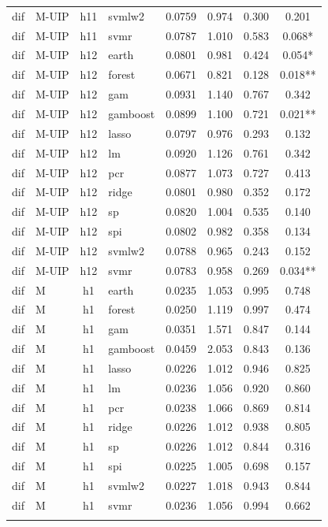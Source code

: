 \begin{ThreePartTable}
\begin{longtable}[t]{llclcccc}
dif & M-UIP & h11 & svmlw2 & 0.0759 & 0.974 & 0.300 & 0.201\\
dif & M-UIP & h11 & svmr & 0.0787 & 1.010 & 0.583 & 0.068*\\
\addlinespace
dif & M-UIP & h12 & earth & 0.0801 & 0.981 & 0.424 & 0.054*\\
dif & M-UIP & h12 & forest & 0.0671 & 0.821 & 0.128 & 0.018**\\
dif & M-UIP & h12 & gam & 0.0931 & 1.140 & 0.767 & 0.342\\
dif & M-UIP & h12 & gamboost & 0.0899 & 1.100 & 0.721 & 0.021**\\
dif & M-UIP & h12 & lasso & 0.0797 & 0.976 & 0.293 & 0.132\\
dif & M-UIP & h12 & lm & 0.0920 & 1.126 & 0.761 & 0.342\\
dif & M-UIP & h12 & pcr & 0.0877 & 1.073 & 0.727 & 0.413\\
dif & M-UIP & h12 & ridge & 0.0801 & 0.980 & 0.352 & 0.172\\
dif & M-UIP & h12 & sp & 0.0820 & 1.004 & 0.535 & 0.140\\
dif & M-UIP & h12 & spi & 0.0802 & 0.982 & 0.358 & 0.134\\
dif & M-UIP & h12 & svmlw2 & 0.0788 & 0.965 & 0.243 & 0.152\\
dif & M-UIP & h12 & svmr & 0.0783 & 0.958 & 0.269 & 0.034**\\
\addlinespace
dif & M & h1 & earth & 0.0235 & 1.053 & 0.995 & 0.748\\
dif & M & h1 & forest & 0.0250 & 1.119 & 0.997 & 0.474\\
dif & M & h1 & gam & 0.0351 & 1.571 & 0.847 & 0.144\\
dif & M & h1 & gamboost & 0.0459 & 2.053 & 0.843 & 0.136\\
dif & M & h1 & lasso & 0.0226 & 1.012 & 0.946 & 0.825\\
dif & M & h1 & lm & 0.0236 & 1.056 & 0.920 & 0.860\\
dif & M & h1 & pcr & 0.0238 & 1.066 & 0.869 & 0.814\\
dif & M & h1 & ridge & 0.0226 & 1.012 & 0.938 & 0.805\\
dif & M & h1 & sp & 0.0226 & 1.012 & 0.844 & 0.316\\
dif & M & h1 & spi & 0.0225 & 1.005 & 0.698 & 0.157\\
dif & M & h1 & svmlw2 & 0.0227 & 1.018 & 0.943 & 0.844\\
dif & M & h1 & svmr & 0.0236 & 1.056 & 0.994 & 0.662\\
\addlinespace

\end{longtable}
\end{ThreePartTable}
